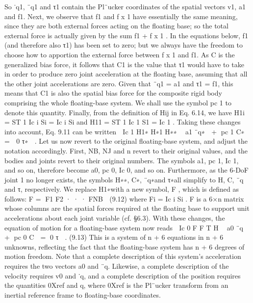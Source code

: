 So ˙q1, ¨q1 and τ1 contain the Pl¨ucker coordinates of the spatial vectors v1, a1 and f1. Next, we observe that f1 and f x 1 have essentially the same meaning, since they are both external forces acting on the floating base; so the total external force is actually given by the sum f1 + f x 1 . In the equations below, f1 (and therefore also τ1) has been set to zero; but we always have the freedom to choose how to apportion the external force between f x 1 and f1. As C is the generalized bias force, it follows that C1 is the value that τ1 would have to take in order to produce zero joint acceleration at the floating base, assuming that all the other joint accelerations are zero. Given that ¨q1 = a1 and τ1 = f1, this means that C1 is also the spatial bias force for the composite rigid body comprising the whole floating-base system. We shall use the symbol pc 1 to denote this quantity. Finally, from the definition of Hij in Eq. 6.14, we have H1i = ST 1 Ic i Si = Ic i Si and H11 = ST 1 Ic 1 S1 = Ic 1 . Taking these changes into account, Eq. 9.11 can be written  Ic 1 H1∗ H∗1 H∗∗  a1 ¨q∗  + pc 1 C∗  =  0 τ∗  . Let us now revert to the original floating-base system, and adjust the notation accordingly. First, NB, NJ and n revert to their original values, and the bodies and joints revert to their original numbers. The symbols a1, pc 1, Ic 1, and so on, therefore become a0, pc 0, Ic 0, and so on. Furthermore, as the 6-DoF joint 1 no longer exists, the symbols H∗∗, C∗, ¨q∗and τ∗all simplify to H, C, ¨q and τ, respectively. We replace H1∗with a new symbol, F , which is defined as follows: F = F1 F2 · · · FNB  (9.12) where Fi = Ic i Si . F is a 6×n matrix whose columns are the spatial forces required at the floating base to support unit accelerations about each joint variable (cf. §6.3). With these changes, the equation of motion for a floating-base system now reads  Ic 0 F F T H  a0 ¨q  + pc 0 C  = 0 τ  . (9.13) This is a system of n + 6 equations in n + 6 unknowns, reflecting the fact that the floating-base system has n + 6 degrees of motion freedom. Note that a complete description of this system’s acceleration requires the two vectors a0 and ¨q. Likewise, a complete description of the velocity requires v0 and ˙q, and a complete description of the position requires the quantities 0Xref and q, where 0Xref is the Pl¨ucker transform from an inertial reference frame to floating-base coordinates.

